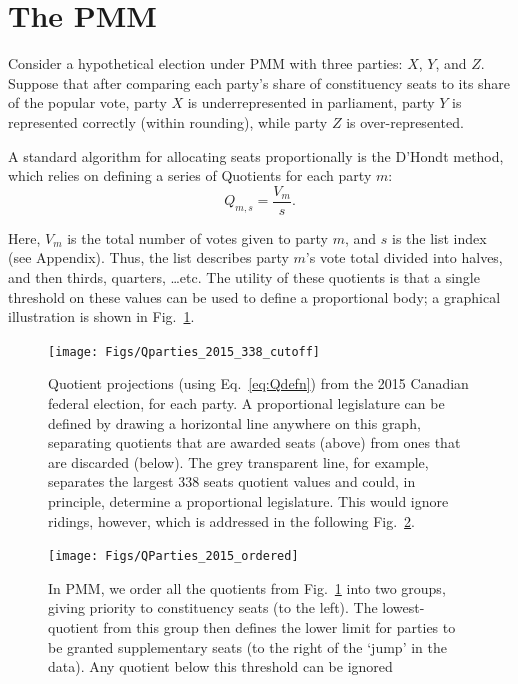 \documentclass[DIV=calc, paper=a4, fontsize=11pt, twocolumn]{scrartcl}	 %
\begin{document}
\section{The PMM}
\label{sec:model_proposal}

Consider a hypothetical election under PMM with three parties: $X$, $Y$, and $Z$. Suppose that after comparing each party's share of constituency seats to its share of the popular vote, party $X$ is underrepresented in parliament, party $Y$ is represented correctly (within rounding), while party $Z$ is over-represented. 

A standard algorithm for allocating seats proportionally is the D'Hondt method, which relies on defining a series of Quotients for each party $m$:
\begin{equation}
\label{eq:Qdefn}
Q_{m,s} = \frac{V_m}{s}.
\end{equation}

Here, $V_m$ is the total number of votes given to party $m$, and $s$ is the list index (see Appendix). Thus, the list describes party $m$'s vote total divided into halves, and then thirds, quarters, \ldots etc. The utility of these quotients is that a single threshold on these values can be used to define a proportional body; a graphical illustration is shown in Fig.~\ref{fig:Qparties_2015_338_cutoff}. 


\begin{figure}[h!]
  \texttt{[image: Figs/Qparties\_2015\_338\_cutoff]}
  \captionsetup{format=default}
  \caption{Quotient projections (using Eq.~\ref{eq:Qdefn}) from the 2015 Canadian federal election, for each party. A proportional legislature can be defined by drawing a horizontal line anywhere on this graph, separating quotients that are awarded seats (above) from ones that are discarded (below). The grey transparent line, for example, separates the largest 338 seats quotient values and could, in principle, determine a proportional legislature. This would ignore ridings, however, which is addressed in the following Fig.~\ref{fig:QParties_2015_ordered}. }
\label{fig:Qparties_2015_338_cutoff}
\end{figure}

\begin{figure}[h!]
  \texttt{[image: Figs/QParties\_2015\_ordered]}
  \captionsetup{format=default}
  \caption{ In PMM, we order all the quotients from Fig.~\ref{fig:Qparties_2015_338_cutoff} into two groups, giving priority to constituency seats (to the left). The lowest-quotient from this group then defines the lower limit for parties to be granted supplementary seats (to the right of the `jump' in the data). Any quotient below this threshold can be ignored }
\label{fig:QParties_2015_ordered}
\end{figure}
\end{document}
